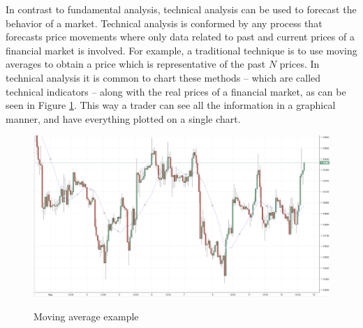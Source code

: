 In contrast to fundamental analysis, technical analysis can be used to forecast the behavior of a market. Technical analysis is conformed by any process that forecasts price movements where only data related to past and current prices of a financial market is involved. For example, a traditional technique is to use moving averages to obtain a price which is representative of the past $N$ prices. In technical analysis it is common to chart these methods -- which are called technical indicators -- along with the real prices of a financial market, as can be seen in Figure \ref{figure:moving-average-example}. This way a trader can see all the information in a graphical manner, and have everything plotted on a single chart.


\begin{figure}
\caption{Moving average example}
\centering
\includegraphics[width=1.0\textwidth]{img/moving-average.png}
\label{figure:moving-average-example}
\end{figure}

